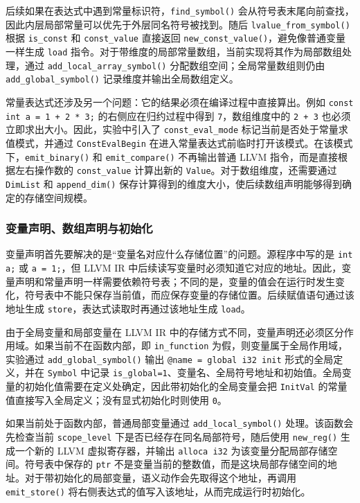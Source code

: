 \documentclass[12pt]{ctexart}
\begin{document}
后续如果在表达式中遇到常量标识符，\texttt{find\_symbol()} 会从符号表末尾向前查找，因此内层局部常量可以优先于外层同名符号被找到。随后 \texttt{lvalue\_from\_symbol()} 根据 \texttt{is\_const} 和 \texttt{const\_value} 直接返回 \texttt{new\_const\_value()}，避免像普通变量一样生成 \texttt{load} 指令。对于带维度的局部常量数组，当前实现将其作为局部数组处理，通过 \texttt{add\_local\_array\_symbol()} 分配数组空间；全局常量数组则仍由 \texttt{add\_global\_symbol()} 记录维度并输出全局数组定义。

常量表达式还涉及另一个问题：它的结果必须在编译过程中直接算出。例如 \texttt{const int a = 1 + 2 * 3;} 的右侧应在归约过程中得到 \texttt{7}，数组维度中的 \texttt{2 + 3} 也必须立即求出大小。因此，实验中引入了 \texttt{const\_eval\_mode} 标记当前是否处于常量求值模式，并通过 \texttt{ConstEvalBegin} 在进入常量表达式前临时打开该模式。在该模式下，\texttt{emit\_binary()} 和 \texttt{emit\_compare()} 不再输出普通 LLVM 指令，而是直接根据左右操作数的 \texttt{const\_value} 计算出新的 \texttt{Value}。对于数组维度，还需要通过 \texttt{DimList} 和 \texttt{append\_dim()} 保存计算得到的维度大小，使后续数组声明能够得到确定的存储空间规模。

\subsubsection{变量声明、数组声明与初始化}

变量声明首先要解决的是“变量名对应什么存储位置”的问题。源程序中写的是 \texttt{int a;} 或 \texttt{a = 1;}，但 LLVM IR 中后续读写变量时必须知道它对应的地址。因此，变量声明和常量声明一样需要依赖符号表；不同的是，变量的值会在运行时发生变化，符号表中不能只保存当前值，而应保存变量的存储位置。后续赋值语句通过该地址生成 \texttt{store}，表达式读取时再通过该地址生成 \texttt{load}。

由于全局变量和局部变量在 LLVM IR 中的存储方式不同，变量声明还必须区分作用域。如果当前不在函数内部，即 \texttt{in\_function} 为假，则变量属于全局作用域，实验通过 \texttt{add\_global\_symbol()} 输出 \texttt{@name = global i32 init} 形式的全局定义，并在 \texttt{Symbol} 中记录 \texttt{is\_global=1}、变量名、全局符号地址和初始值。全局变量的初始化值需要在定义处确定，因此带初始化的全局变量会把 \texttt{InitVal} 的常量值直接写入全局定义；没有显式初始化时则使用 \texttt{0}。

如果当前处于函数内部，普通局部变量通过 \texttt{add\_local\_symbol()} 处理。该函数会先检查当前 \texttt{scope\_level} 下是否已经存在同名局部符号，随后使用 \texttt{new\_reg()} 生成一个新的 LLVM 虚拟寄存器，并输出 \texttt{alloca i32} 为该变量分配局部存储空间。符号表中保存的 \texttt{ptr} 不是变量当前的整数值，而是这块局部存储空间的地址。对于带初始化的局部变量，语义动作会先取得这个地址，再调用 \texttt{emit\_store()} 将右侧表达式的值写入该地址，从而完成运行时初始化。
\end{document}
